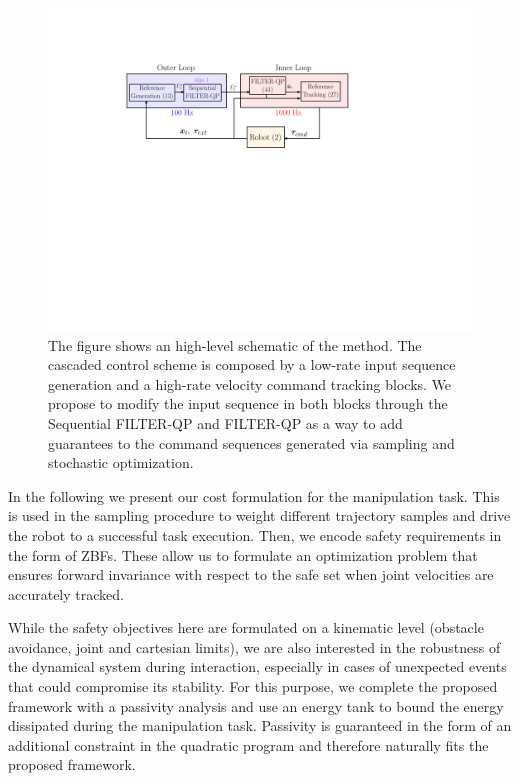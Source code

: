 \begin{figure}[t!]
\centering
\vspace{-0.5cm}
\includegraphics[width=0.95\columnwidth] {figures/schemes/receding_horizon_new_paper2.pdf}
\caption{The figure shows an high-level schematic of the method. The cascaded control scheme is composed by a low-rate input sequence generation and a high-rate velocity command tracking blocks. We propose to modify the input sequence in both blocks through the Sequential FILTER-QP and FILTER-QP as a way to add guarantees to the command sequences generated via sampling and stochastic optimization. } \label{fig:block_scheme}
\end{figure}


In the following we present our cost formulation for the manipulation task. This is used in the sampling procedure to weight different trajectory samples and drive the robot to a successful task execution. Then, we encode safety requirements in the form of ZBFs. These allow us to formulate an optimization problem that ensures forward invariance with respect to the safe set when joint velocities are accurately tracked.

While the safety objectives here are formulated on a kinematic level (obstacle avoidance, joint and cartesian limits), we are also interested in the robustness of the dynamical system during interaction, especially in cases of unexpected events that could compromise its stability. For this purpose, we complete the proposed framework with a passivity analysis and use an energy tank to bound the energy dissipated during the manipulation task. Passivity is guaranteed in the form of an additional constraint in the quadratic program and therefore naturally fits the proposed framework.

